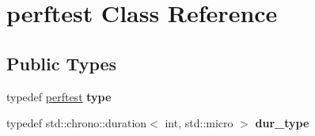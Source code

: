 \hypertarget{classperftest}{}\section{perftest Class Reference}
\label{classperftest}
\subsection*{Public Types}
\begin{DoxyCompactItemize}
\item 
\mbox{\label{classperftest_aa3bc7062756508ea5ef5d5b6ab670123}} 
typedef \mbox{\hyperlink{classperftest}{perftest}} {\bfseries type}
\item 
\mbox{\label{classperftest_a73df13a9223345b26476878a25eb1946}} 
typedef std\+::chrono\+::duration$<$ int, std\+::micro $>$ {\bfseries dur\+\_\+type}
\end{DoxyCompactItemize}
